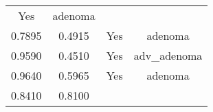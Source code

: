 \documentclass[12pt,]{article}
\begin{document}
\begin{longtable}[]{@{}cccc@{}}
\begin{minipage}[t]{0.22\columnwidth}
Yes\strut
\end{minipage} & \begin{minipage}[t]{0.16\columnwidth}\centering\strut
adenoma\strut
\end{minipage}\tabularnewline
\begin{minipage}[t]{0.24\columnwidth}\centering\strut
0.7895\strut
\end{minipage} & \begin{minipage}[t]{0.26\columnwidth}\centering\strut
0.4915\strut
\end{minipage} & \begin{minipage}[t]{0.22\columnwidth}\centering\strut
Yes\strut
\end{minipage} & \begin{minipage}[t]{0.16\columnwidth}\centering\strut
adenoma\strut
\end{minipage}\tabularnewline
\begin{minipage}[t]{0.24\columnwidth}\centering\strut
0.9590\strut
\end{minipage} & \begin{minipage}[t]{0.26\columnwidth}\centering\strut
0.4510\strut
\end{minipage} & \begin{minipage}[t]{0.22\columnwidth}\centering\strut
Yes\strut
\end{minipage} & \begin{minipage}[t]{0.16\columnwidth}\centering\strut
adv\_adenoma\strut
\end{minipage}\tabularnewline
\begin{minipage}[t]{0.24\columnwidth}\centering\strut
0.9640\strut
\end{minipage} & \begin{minipage}[t]{0.26\columnwidth}\centering\strut
0.5965\strut
\end{minipage} & \begin{minipage}[t]{0.22\columnwidth}\centering\strut
Yes\strut
\end{minipage} & \begin{minipage}[t]{0.16\columnwidth}\centering\strut
adenoma\strut
\end{minipage}\tabularnewline
\begin{minipage}[t]{0.24\columnwidth}\centering\strut
0.8410\strut
\end{minipage} & \begin{minipage}[t]{0.26\columnwidth}\centering\strut
0.8100\strut
\end{minipage} & \begin{minipage}[t]{0.22\columnwidth}\centering\strut

\end{minipage}
\end{longtable}
\end{document}
